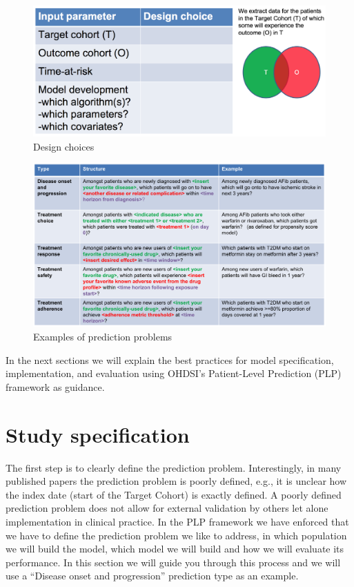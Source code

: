 \documentclass[]{book}
\begin{document}
\begin{figure}
\includegraphics[width=1\linewidth]{images/PatientLevelPrediction/studydesign} \caption{Design choices}\label{fig:studydesign}
\end{figure}

\begin{figure}
\includegraphics[width=1\linewidth]{images/PatientLevelPrediction/problems} \caption{Examples of prediction problems}\label{fig:problems}
\end{figure}

In the next sections we will explain the best practices for model
specification, implementation, and evaluation using OHDSI's
Patient-Level Prediction (PLP) framework as guidance.

\section{Study specification}\label{study-specification}

The first step is to clearly define the prediction problem.
Interestingly, in many published papers the prediction problem is poorly
defined, e.g., it is unclear how the index date (start of the Target
Cohort) is exactly defined. A poorly defined prediction problem does not
allow for external validation by others let alone implementation in
clinical practice. In the PLP framework we have enforced that we have to
define the prediction problem we like to address, in which population we
will build the model, which model we will build and how we will evaluate
its performance. In this section we will guide you through this process
and we will use a ``Disease onset and progression'' prediction type as
an example.
\end{document}

